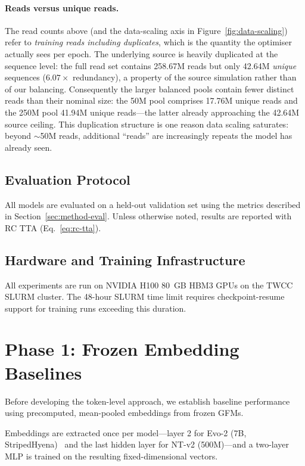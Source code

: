 \paragraph{Reads versus unique reads.} The read counts above (and the data-scaling axis in Figure~\ref{fig:data-scaling}) refer to \emph{training reads including duplicates}, which is the quantity the optimiser actually sees per epoch. The underlying source is heavily duplicated at the sequence level: the full read set contains 258.67M reads but only 42.64M \emph{unique} sequences ($6.07\times$ redundancy), a property of the source simulation rather than of our balancing. Consequently the larger balanced pools contain fewer distinct reads than their nominal size: the 50M pool comprises 17.76M unique reads and the 250M pool 41.94M unique reads---the latter already approaching the 42.64M source ceiling. This duplication structure is one reason data scaling saturates: beyond $\sim$50M reads, additional ``reads'' are increasingly repeats the model has already seen.

\subsection{Evaluation Protocol}

All models are evaluated on a held-out validation set using the metrics described in Section~\ref{sec:method-eval}. Unless otherwise noted, results are reported with RC TTA (Eq.~\ref{eq:rc-tta}).

\subsection{Hardware and Training Infrastructure}

All experiments are run on NVIDIA H100 80~GB HBM3 GPUs on the TWCC SLURM cluster. The 48-hour SLURM time limit requires checkpoint-resume support for training runs exceeding this duration.

\section{Phase 1: Frozen Embedding Baselines}
\label{sec:exp-frozen}

Before developing the token-level approach, we establish baseline performance using precomputed, mean-pooled embeddings from frozen GFMs.

Embeddings are extracted once per model---layer 2 for Evo-2 (7B, StripedHyena)~\cite{Brixi2025} and the last hidden layer for NT-v2 (500M)---and a two-layer MLP is trained on the resulting fixed-dimensional vectors.

